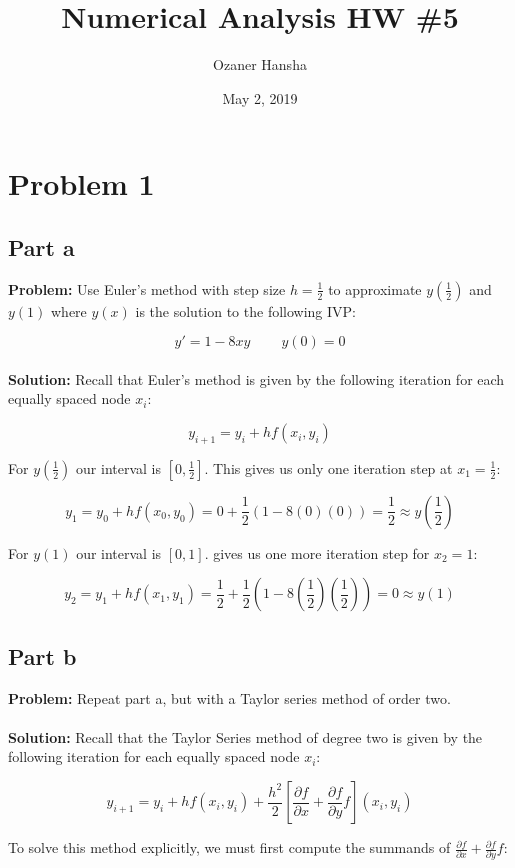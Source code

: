 \documentclass{article}
\begin{document}
\title{Numerical Analysis HW \#5}
\author{Ozaner Hansha}
\date{May 2, 2019}
\maketitle

\section*{Problem 1}
\subsection*{Part a}
\textbf{Problem:} Use Euler's method with step size $h=\frac{1}{2}$ to approximate $y\left(\frac{1}{2}\right)$ and $y(1)$ where $y(x)$ is the solution to the following IVP:

$$y'=1-8xy\ \ \ \ \ \ \ \ \ \  y(0)=0$$
\\
\textbf{Solution:} Recall that Euler's method is given by the following iteration for each equally spaced node $x_i$:

$$y_{i+1}=y_i+hf(x_i,y_i)$$

For $y\left(\frac{1}{2}\right)$ our interval is $[0,\frac{1}{2}]$. This gives us only one iteration step at $x_1=\frac{1}{2}$:

$$y_1=y_0+hf(x_0,y_0)=0+\frac{1}{2}(1-8(0)(0))=\boxed{\frac{1}{2}\approx y\left(\frac{1}{2}\right)}$$

For $y(1)$ our interval is $[0,1]$. gives us one more iteration step for $x_2=1$:

$$y_2=y_1+hf(x_1,y_1)=\frac{1}{2}+\frac{1}{2}\left(1-8\left(\frac{1}{2}\right)\left(\frac{1}{2}\right)\right)=\boxed{0\approx y(1)}$$

\subsection*{Part b}
\textbf{Problem:} Repeat part a, but with a Taylor series method of order two.
\\\\
\textbf{Solution:} Recall that the Taylor Series method of degree two is given by the following iteration for each equally spaced node $x_i$:

$$y_{i+1}=y_i+hf(x_i,y_i)+\frac{h^2}{2}\left[\frac{\partial f}{\partial x}+\frac{\partial f}{\partial y}f\right](x_i,y_i)$$

To solve this method explicitly, we must first compute the summands of $\frac{\partial f}{\partial x}+\frac{\partial f}{\partial y}f$:
\end{document}

